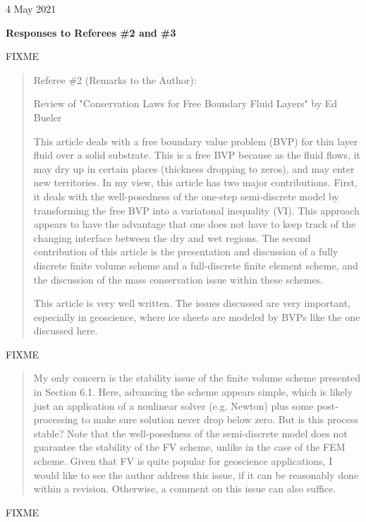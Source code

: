 \documentclass[12pt]{amsart}
\newcommand{\mm}{\medskip \noindent}
\begin{document}
\hfill 4 May 2021

\bigskip

\large\centerline{\textbf{Responses to Referees \#2 and \#3}}
\bigskip
\normalsize

\thispagestyle{empty}

FIXME

\begin{quote}
Referee \#2 (Remarks to the Author):

\mm Review of "Conservation Laws for Free Boundary Fluid Layers" by Ed Bueler

\mm This article deals with a free boundary value problem (BVP) for thin layer fluid over a solid substrate.  This is a free BVP because as the fluid flows, it may dry up in certain places (thickness dropping to zeros), and may enter new territories.  In my view, this article has two major contributions.  First, it deals with the well-posedness of the one-step semi-discrete model by transforming the free BVP into a variatonal inequality (VI).  This approach appears to have the advantage that one does not have to keep track of the changing interface between the dry and wet regions.  The second contribution of this article is the presentation and discussion of a fully discrete finite volume scheme and a full-discrete finite element scheme, and the discussion of the mass conservation issue within these schemes.

\mm This article is very well written.  The issues discussed are very important, especially in geoscience, where ice sheets are modeled by BVPs like the one discussed here.  
\end{quote}

FIXME

\begin{quote}
My only concern is the stability issue of the finite volume scheme presented in Section 6.1. Here, advancing the scheme appears simple, which is likely just an application of a nonlinear solver (e.g. Newton) plus some post-processing to make sure solution never drop below zero. But is this process stable? Note that the well-posedness of the semi-discrete model does not guarantee the stability of the FV scheme, unlike in the case of the FEM scheme.  Given that FV is quite popular for geoscience applications, I would like to see the author address this issue, if it can be reasonably done within a revision. Otherwise, a comment on this issue can also suffice.
\end{quote}

FIXME
\end{document}
